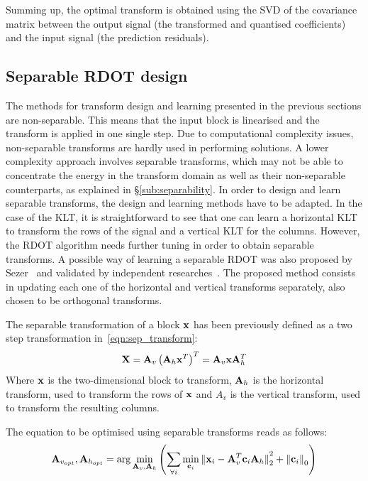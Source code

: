 \documentclass[11pt,a4paper,openright,twoside]{book}
\numberwithin{equation}{section} %
\numberwithin{figure}{section} %
\numberwithin{table}{section} %
\begin{document}
Summing up, the optimal transform is obtained using the \ac{SVD} of the
covariance matrix between the output signal (the transformed and quantised
coefficients) and the input signal (the prediction residuals).

\subsection{Separable \acs{RDOT} design}
\label{sub:separable_rdot_design}

The methods for transform design and learning presented in the previous
sections are non-separable.
This means that the input block is linearised and the transform is applied in
one single step.
Due to computational complexity issues, non-separable transforms are hardly
used in performing solutions.
A lower complexity approach involves separable transforms, which may not be
able to concentrate the energy in the transform domain as well as their
non-separable counterparts, as explained in \S\ref{sub:separability}.
In order to design and learn separable transforms, the design and learning
methods have to be adapted.
In the case of the \ac{KLT}, it is straightforward to see that one can learn a
horizontal \ac{KLT} to transform the rows of the signal and a vertical
\ac{KLT} for the columns.
However, the \ac{RDOT} algorithm needs further tuning in order to obtain
separable transforms.
A possible way of learning a separable \ac{RDOT} was also proposed by
Sezer~\cite{sezer-11-phd} and validated by independent
researches~\cite{sole-09-sparsity-optimisation-separable-transforms}.
The proposed method consists in updating each one of the horizontal and
vertical transforms separately, also chosen to be orthogonal transforms.

The separable transformation of a block $\mathbf{x}$ has been previously defined as a
two step transformation in~\eqref{eqn:sep_transform}:
\begin{equation*}
  \mathbf{X} = {\mathbf{A}_v\left( \mathbf{A}_h \mathbf{x}^T \right)}^T = \mathbf{A}_v \mathbf{x} \mathbf{A}_h^T
\end{equation*}
Where $\mathbf{x}$ is the two-dimensional block to transform, $\mathbf{A}_h$ is the horizontal
transform, used to transform the rows of $\mathbf{x}$ and $A_v$ is the vertical
transform, used to transform the resulting columns.

The equation to be optimised using separable transforms reads as follows:
\begin{equation}
	\mathbf{A}_{v_{opt}}, \mathbf{A}_{h_{opt}} = \text{arg}\min\limits_{\mathbf{A}_v,\mathbf{A}_h}
	\left(
	\sum_{\forall i} \min\limits_{\mathbf{c}_i}{\Vert \mathbf{x}_i - \mathbf{A}_v^T\mathbf{c}_i\mathbf{A}_h \Vert}_2^2
	+ {\Vert \mathbf{c}_i \Vert}_0
	\right)
	\label{eqn:rdot-sep}
\end{equation}
\end{document}
